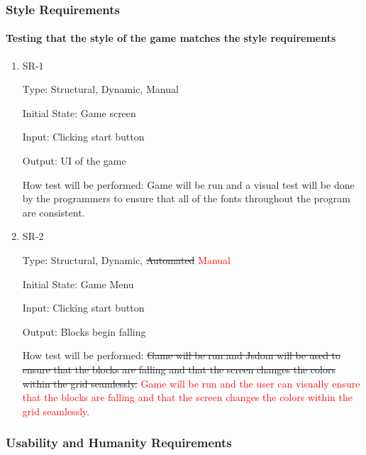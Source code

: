 \documentclass[12pt, titlepage]{article}
\begin{document}
\subsubsection{Style Requirements}
\paragraph{Testing that the style of the game matches the style requirements}

\begin{enumerate}

\item{SR-1\\}

Type: Structural, Dynamic, Manual
					
Initial State: Game screen
					
Input: Clicking start button 
					
Output: UI of the game
					
How test will be performed: Game will be run and a visual test will be done by the programmers to ensure that all of the fonts throughout the program are consistent. 

\item{SR-2\\}

Type: Structural, Dynamic, \sout{Automated} \textcolor{red}{Manual}
					
Initial State: Game Menu 
					
Input: Clicking start button 
					
Output: Blocks begin falling
					
How test will be performed: \sout{Game will be run and Jsdom will be used to ensure that the blocks are falling and that the screen changes the colors within the grid seamlessly.}
\textcolor{red}{Game will be run and the user can visually ensure that the blocks are falling and that the screen changes the colors within the grid seamlessly.} 

\end{enumerate}

\subsubsection{Usability and Humanity Requirements}
\end{document}
